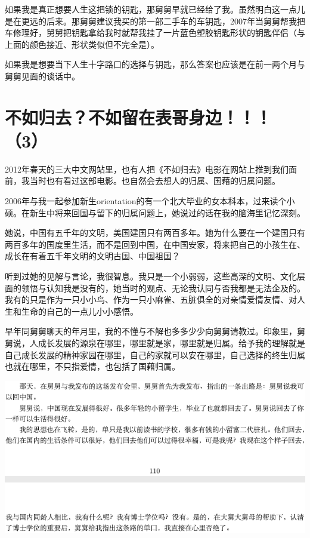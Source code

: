 \documentclass[9pt, b5paper]{article}
\begin{document}
如果我是真正想要人生这把锁的钥匙，那舅舅早就已经给了我。虽然明白这一点儿是在更远的后来。那舅舅建议我买的第一部二手车的车钥匙，2007年当舅舅帮我把车修理好，舅舅把钥匙拿给我时就帮我挂了一片蓝色塑胶钥匙形状的钥匙伴侣（与上面的颜色接近、形状类似但不完全是）。

如果我是想要当下人生十字路口的选择与钥匙，那么答案也应该是在前一两个月与舅舅见面的谈话中。 

\section{不如归去？不如留在表哥身边！！！（3）}
\label{sec:org842d24c}

2012年春天的三大中文网站里，也有人把《不如归去》电影在网站上推到我们面前，我当时也有看过这部电影。也自然会去想人的归属、国藉的归属问题。 

2006年与我一起参加新生orientation的有一个北大毕业的女本科本，过来读个小硕。在新生中将来回国与留下的归属问题上，她说过的话在我的脑海里记忆深刻。

她说，中国有五千年的文明，美国建国只有两百多年。她为什么要在一个建国只有两百多年的国度里生活，而不是回到中国，在中国安家，将来把自己的小孩生在、成长在有着五千年文明的文明古国、中国祖国？

听到过她的见解与言论，我很智息。我只是一个小弱弱，这些高深的文明、文化层面的领悟与认知我是没有的，她当时的观点、无论我认同与否我都是无法企及的。我有的只是作为一只小小鸟、作为一只小麻雀、五脏俱全的对亲情爱情友情、对人生和生命的自己的一点儿小小感悟。

早年同舅舅聊天的年月里，我的不懂与不解也多多少少向舅舅请教过。印象里，舅舅说，人成长发展的源泉在哪里，哪里就是家，哪里就是归属。给予我的理解就是自己成长发展的精神家园在哪里，自己的家就可以安在哪里，自己选择的终生归属也就在哪里，不只指爱情，也包括了国藉归属。

\begin{center}
\includegraphics[width=.9\linewidth]{./pic/backups_plans_20210415_175457.png}
\end{center}
\end{document}
